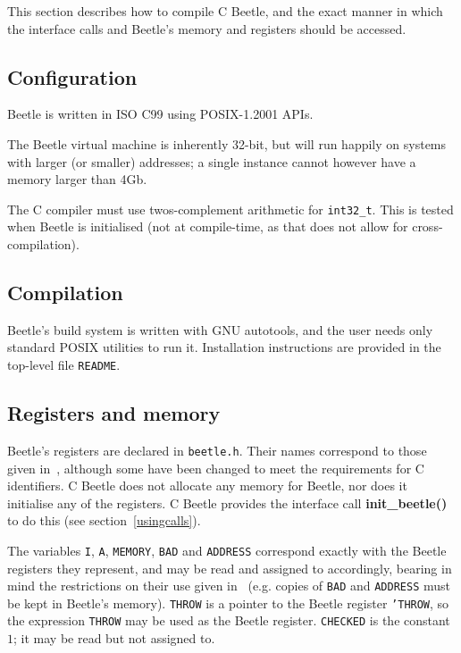 \documentclass{article}
\begin{document}
This section describes how to compile C Beetle, and the exact manner in which
the interface calls and Beetle's memory and registers should be accessed.


\subsection{Configuration}
\label{configuration}

Beetle is written in ISO C99 using POSIX-1.2001 APIs.

The Beetle virtual machine is inherently 32-bit, but will run happily on systems with larger (or smaller) addresses; a single instance cannot however have a memory larger than 4Gb.

The C compiler must use twos-complement arithmetic for {\tt int32\_t}.
This is tested when Beetle is initialised (not at compile-time, as
that does not allow for cross-compilation).


\subsection{Compilation}

Beetle's build system is written with GNU autotools, and the user
needs only standard POSIX utilities to run it. Installation
instructions are provided in the top-level file {\tt README}.


\subsection{Registers and memory}

Beetle's registers are declared in {\tt beetle.h}. Their names correspond to
those given in~\cite[section~2.1]{beetle}, although some have been changed
to meet the requirements for C identifiers. C Beetle does not allocate any
memory for Beetle, nor does it initialise any of the registers. C Beetle
provides the interface call {\bf init\_beetle()} to do this (see
section~\ref{usingcalls}).

The variables {\tt I}, {\tt A}, {\tt MEMORY}, {\tt BAD} and {\tt ADDRESS}
correspond exactly with the Beetle registers they represent, and may be read
and assigned to accordingly, bearing in mind the restrictions on their use
given in~\cite{beetle} (e.g. copies of {\tt BAD} and {\tt ADDRESS} must be
kept in Beetle's memory). {\tt THROW} is a pointer to the Beetle register
{\tt 'THROW}, so the expression {\tt *THROW} may be used as the Beetle
register. {\tt CHECKED} is the constant $1$; it may be read but not
assigned to.
\end{document}
